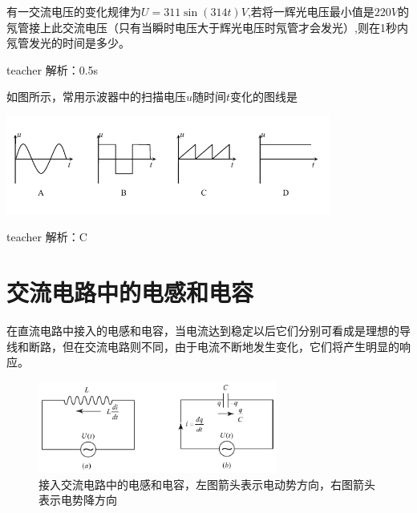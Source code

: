 \begin{example}

有一交流电压的变化规律为$U = 311\sin (314t)\unit{V}$,若将一辉光电压最小值是$220\unit{V}$的氖管接上此交流电压（只有当瞬时电压大于辉光电压时氖管才会发光）,则在1秒内氖管发光的时间是多少。

\begin{taggedblock}{teacher}
\noindent
解析：0.5s
\end{taggedblock}
\end{example}




\begin{example}
如图所示，常用示波器中的扫描电压$u$随时间$t$变化的图线是
\begin{center}
\includegraphics[width = 0.8\textwidth]{images/alt-current-5.pdf} 
\end{center}


\begin{taggedblock}{teacher}
\noindent
解析：C
\end{taggedblock}
\end{example}


\section{交流电路中的电感和电容}
在直流电路中接入的电感和电容，当电流达到稳定以后它们分别可看成是理想的导线和断路，但在交流电路则不同，由于电流不断地发生变化，它们将产生明显的响应。

\begin{figure}[hb]
\centering
\includegraphics[width=0.7\textwidth]{images/alt-current-1.pdf}
\caption{接入交流电路中的电感和电容，左图箭头表示电动势方向，右图箭头表示电势降方向}
\label{fig:alt-current-1}
\end{figure}


